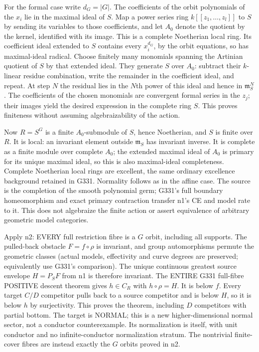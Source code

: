 For the formal case write $d_G=|G|$. The coefficients of the orbit
polynomials of the $x_i$ lie in the maximal ideal of $S$. Map a power
series ring $k[[z_1,\ldots,z_l]]$ to $S$ by sending its variables to those
coefficients, and let $A_0$ denote the quotient by the kernel, identified
with its image. This is a complete Noetherian local ring. Its coefficient
ideal extended to $S$ contains every $x_i^{d_G}$, by the orbit equations,
so has maximal-ideal radical. Choose finitely many monomials spanning
the Artinian quotient of $S$ by that extended ideal. They generate $S$
over $A_0$: subtract their $k$-linear residue combination, write the
remainder in the coefficient ideal, and repeat. At step $N$ the residual
lies in the $N$th power of this ideal and hence in $\mathfrak m_S^N$.
The coefficients of the chosen monomials are convergent formal series in
the $z_j$; their images yield the desired expression in the complete ring
$S$. This proves finiteness without assuming algebraizability of the action.

Now $R=S^G$ is a finite $A_0$-submodule of $S$, hence Noetherian, and $S$
is finite over $R$. It is local: an invariant element outside
$\mathfrak m_S$ has invariant inverse. It is complete as a finite module
over complete $A_0$; the extended maximal ideal of $A_0$ is primary for
its unique maximal ideal, so this is also maximal-ideal completeness.
Complete Noetherian local rings are excellent, the same ordinary
excellence background retained in G331. Normality follows as in the
affine case. The source is the completion of the smooth polynomial germ;
G331's full boundary homeomorphism and exact primary contraction transfer
n1's CE and model rate to it. This does not algebraize the finite action
or assert equivalence of arbitrary geometric model categories.

Apply n2: EVERY full restriction fibre is a $G$ orbit, including all
supports. The pulled-back obstacle $F=f\circ\rho$ is invariant, and group
automorphisms permute the geometric classes (actual models, effectivity
and curve degrees are preserved; equivalently use G331's comparison).
The unique continuous greatest source envelope $H=P_S F$ from n1 is
therefore invariant. The ENTIRE G331 full-fibre POSITIVE descent theorem
gives $h\in C_R$ with $h\circ\rho=H$. It is below $f$. Every target
$C/D$ competitor pulls back to a source competitor and is below $H$,
so it is below $h$ by surjectivity. This proves the theorem, including
$D$ competitors with partial bottom. The target is NORMAL; this is a
new higher-dimensional normal sector, not a conductor counterexample.
Its normalization is itself, with unit conductor and no infinite-conductor
normalization stratum. The nontrivial finite-cover fibres are instead
exactly the $G$ orbits proved in n2.

